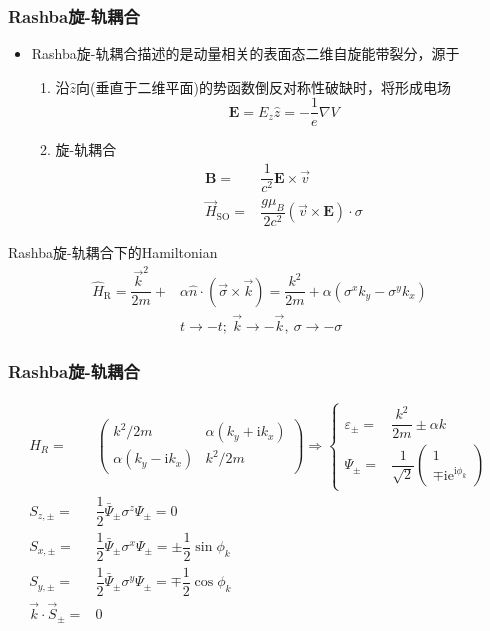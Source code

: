 \frame
{
	\frametitle{\textrm{Rashba}旋-轨耦合}
	\begin{itemize}
	\item \textrm{Rashba}旋-轨耦合描述的是动量相关的表面态二维自旋能带裂分，源于
		\begin{enumerate}
			\item 沿$\hat z$向(垂直于二维平面)的势函数倒反对称性破缺时，将形成电场
				\begin{displaymath}
					\mathbf E=E_z\hat z=-\dfrac1{e}\nabla V
				\end{displaymath}
			\item 旋-轨耦合
				\begin{displaymath}
					\begin{aligned}
						\mathbf B=&\dfrac1{c^2}\mathbf{E}\times\vec v\\
						\vec H_{\mathrm{SO}}=&\dfrac{g\mu_B}{2c^2}(\vec v\times\mathbf E)\cdot\sigma
					\end{aligned}
				\end{displaymath}
		\end{enumerate}
	\end{itemize}
	\textrm{Rashba}旋-轨耦合下的\textrm{Hamiltonian}
	\begin{displaymath}
		\begin{aligned}
		\hat H_{\mathrm R}=\dfrac{\vec k^2}{2m}+&\alpha\hat{n}\cdot(\vec\sigma\times\vec k)=\dfrac{k^2}{2m}+\alpha(\sigma^xk_y-\sigma^yk_x)\\
		&t\rightarrow-t;~\vec k\rightarrow-\vec k,~\sigma\rightarrow-\sigma
		\end{aligned}
	\end{displaymath}
}

\frame
{
	\frametitle{\textrm{Rashba}旋-轨耦合}
	\begin{displaymath}
		\begin{aligned}
		H_R=&
		\begin{pmatrix}
			k^2/2m &\alpha(k_y+\mathrm{i}k_x)\\
			\alpha(k_y-\mathrm{i}k_x) &k^2/2m
		\end{pmatrix}\Rightarrow\left\{
			\begin{aligned}
				\varepsilon_{\pm}=&\dfrac{k^2}{2m}\pm\alpha k\\
				\Psi_{\pm}=&\dfrac1{\sqrt2}
				\begin{pmatrix}
					1\\
					\mp\mathrm{ie}^{\mathrm{i}\phi_k}
				\end{pmatrix}
			\end{aligned}\right.\\
			S_{z,\pm}=&\dfrac12\bar{\Psi}_{\pm}\sigma^z\Psi_{\pm}=0\\ 
			S_{x,\pm}=&\dfrac12\bar{\Psi}_{\pm}\sigma^x\Psi_{\pm}=\pm\dfrac12\sin\phi_k\\
			S_{y,\pm}=&\dfrac12\bar{\Psi}_{\pm}\sigma^y\Psi_{\pm}=\mp\dfrac12\cos\phi_k\\
			\vec k\cdot\vec S_{\pm}=&0
		\end{aligned}
	\end{displaymath}
}

